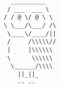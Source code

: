 \documentclass{article}
\begin{document}
\vfill
\vfill
\begin{center}
\begin{BVerbatim}
                   __________
                  / ___  ___ \
                 / / @ \/ @ \ \
                 \ \___/\___/ /\
                  \____\/____/||
                  /     /\\\\\//
                  |     |\\\\\\
                  \      \\\\\\
                   \______/\\\\
                     ||_||_
                     -- --
\end{BVerbatim}
\end{center}
\end{document}

